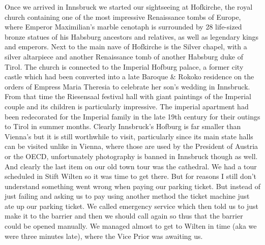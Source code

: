 {Once we arrived in Innsbruck we started our sightseeing at Hofkirche, the royal church containing one of the most impressive Renaissance tombs of Europe, where Emperor Maximilian's marble cenotaph is surrounded by 28 life-sized bronze statues of his Habsburg ancestors and relatives, as well as legendary kings and emperors. Next to the main nave of Hofkirche is the Silver chapel, with a silver altarpiece and another Renaissance tomb of another Habsburg duke of Tirol. The church is connected to the Imperial Hofburg palace, a former city castle which had been converted into a late Baroque \& Rokoko residence on the orders of Empress Maria Theresia to celebrate her son's wedding in Innsbruck. From that time the Riesensaal festival hall with giant paintings of the Imperial couple and its children is particularly impressive. The imperial apartment had been redecorated for the Imperial family in the late 19th century for their outings to Tirol in summer months. Clearly Innsbruck's Hofburg is far smaller than Vienna's but it is still worthwhile to visit, particularly since its main state halls can be visited unlike in Vienna, where those are used by the President of Austria or the OECD, unfortunately photography is banned in Innsbruck though as well. And clearly the last item on our old town tour was the cathedral. We had a tour scheduled in Stift Wilten so it was time to get there. But for reasons I still don't understand something went wrong when paying our parking ticket. But instead of just failing and asking us to pay using another method the ticket machine just ate up our parking ticket. We called emergency service which then told us to just make it to the barrier and then we should call again so thus that the barrier could be opened manually. We managed almost to get to Wilten in time (aka we were three minutes late), where the Vice Prior was awaiting us.\\

}
